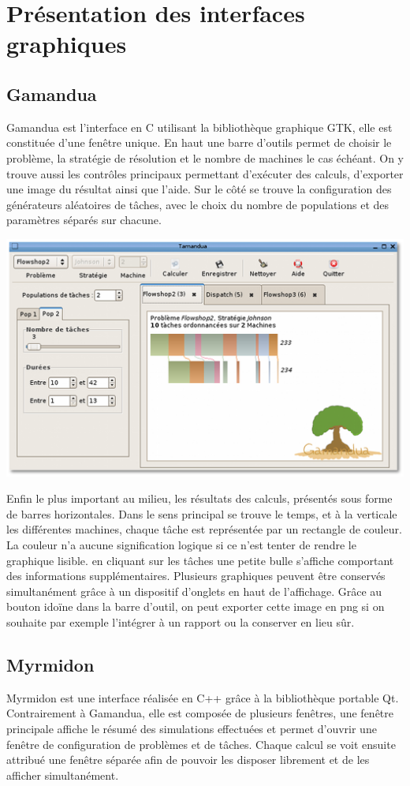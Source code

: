 \section{Présentation des interfaces graphiques}
\subsection{Gamandua}
Gamandua est l'interface en C utilisant la bibliothèque graphique GTK, elle est
constituée d'une fenêtre unique. En haut une barre d'outils permet de choisir 
le problème, la stratégie de résolution et le nombre de machines le cas échéant.
On y trouve aussi les contrôles principaux permettant d'exécuter des calculs,
d'exporter une image du résultat ainsi que l'aide. Sur le côté se trouve la
configuration des générateurs aléatoires de tâches, avec le choix du nombre
de populations et des paramètres séparés sur chacune.
\begin{center}
\includegraphics{gamandua.png}
\end{center}
Enfin le plus important au
milieu, les résultats des calculs, présentés sous forme de barres horizontales.
Dans le sens principal se trouve le temps, et à la verticale les différentes
machines, chaque tâche est représentée par un rectangle de couleur. La couleur
n'a aucune signification logique si ce n'est tenter de rendre le graphique
lisible. en cliquant sur les tâches une petite bulle s'affiche comportant des
informations supplémentaires. Plusieurs graphiques peuvent être conservés
simultanément grâce à un dispositif d'onglets en haut de l'affichage. Grâce au
bouton idoïne dans la barre d'outil, on peut exporter cette image en png si
on souhaite par exemple l'intégrer à un rapport ou la conserver en lieu sûr.
\subsection{Myrmidon}
Myrmidon est une interface réalisée en C++ grâce à la bibliothèque portable Qt.
Contrairement à Gamandua, elle est composée de plusieurs fenêtres, une fenêtre
principale affiche le résumé des simulations effectuées et permet d'ouvrir une
fenêtre de configuration de problèmes et de tâches. Chaque calcul se voit
ensuite attribué une fenêtre séparée afin de pouvoir les disposer librement et
de les afficher simultanément.

